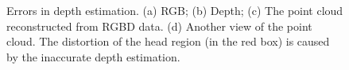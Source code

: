 \begin{figure}[ht]
	\centering
	\caption{Errors in depth estimation. (a) RGB; (b) Depth; (c) The point cloud reconstructed from RGBD data. (d) Another view of the point cloud. The distortion of the head region (in the red box) is caused by the inaccurate depth estimation. }
	\label{fig:deptherror}
\end{figure}



